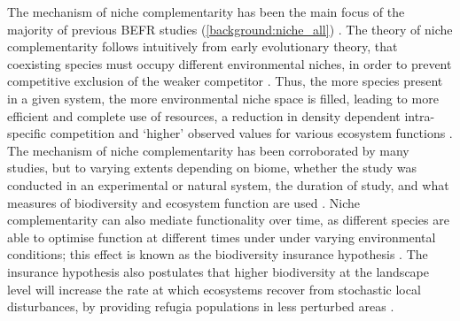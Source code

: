 \begin{refsection}
The mechanism of niche complementarity has been the main focus of the majority of previous BEFR studies (\autoref{background:niche_all}) \citep{Wright2017}. The theory of niche complementarity follows intuitively from early evolutionary theory, that coexisting species must occupy different environmental niches, in order to prevent competitive exclusion of the weaker competitor \citep{Tobner2016, Levine2009, MacArthur1955, MacArthur1967}. Thus, the more species present in a given system, the more environmental niche space is filled, leading to more efficient and complete use of resources, a reduction in density dependent intra-specific competition and `higher' observed values for various ecosystem functions \citep{Isbell2013}. The mechanism of niche complementarity has been corroborated by many studies, but to varying extents depending on biome, whether the study was conducted in an experimental or natural system, the duration of study, and what measures of biodiversity and ecosystem function are used \citep{Wright2017, Cardinale2009, Cardinale2011}. Niche complementarity can also mediate functionality over time, as different species are able to optimise function at different times under under varying environmental conditions; this effect is known as the biodiversity insurance hypothesis \citep{Morin2014b, Bartomeus2013, Yachi1999a}. The insurance hypothesis also postulates that higher biodiversity at the landscape level will increase the rate at which ecosystems recover from stochastic local disturbances, by providing refugia populations in less perturbed areas \citep{Gonzalez2009}. 


\end{refsection}
